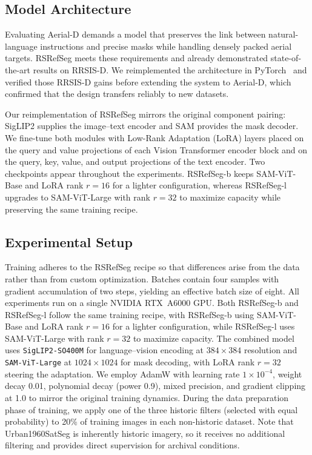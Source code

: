 \documentclass[journal]{IEEEtran}
\begin{document}
\subsection{Model Architecture}
\label{subsec:model_architecture}

Evaluating Aerial-D demands a model that preserves the link between natural-language instructions and precise masks while handling densely packed aerial targets. RSRefSeg meets these requirements and already demonstrated state-of-the-art results on RRSIS-D\cite{liu2024rotated}. We reimplemented the architecture in PyTorch~\cite{pytorch} and verified those RRSIS-D gains before extending the system to Aerial-D, which confirmed that the design transfers reliably to new datasets.

Our reimplementation of RSRefSeg\cite{chen2025rsrefseg} mirrors the original component pairing: SigLIP2\cite{siglip2} supplies the image--text encoder and SAM\cite{sam} provides the mask decoder. We fine-tune both modules with Low-Rank Adaptation (LoRA)\cite{lora} layers placed on the query and value projections of each Vision Transformer\cite{vit} encoder block and on the query, key, value, and output projections of the text encoder. Two checkpoints appear throughout the experiments. RSRefSeg-b keeps SAM-ViT-Base and LoRA rank $r=16$ for a lighter configuration, whereas RSRefSeg-l upgrades to SAM-ViT-Large with rank $r=32$ to maximize capacity while preserving the same training recipe.

\subsection{Experimental Setup}
\label{subsec:experimental_setup}

Training adheres to the RSRefSeg recipe so that differences arise from the data rather than from custom optimization. Batches contain four samples with gradient accumulation of two steps, yielding an effective batch size of eight. All experiments run on a single NVIDIA RTX~A6000 GPU. Both RSRefSeg-b and RSRefSeg-l follow the same training recipe, with RSRefSeg-b using SAM-ViT-Base and LoRA rank $r=16$ for a lighter configuration, while RSRefSeg-l uses SAM-ViT-Large with rank $r=32$ to maximize capacity. The combined model uses \texttt{SigLIP2-SO400M} for language--vision encoding at $384\times384$ resolution and \texttt{SAM-ViT-Large} at $1024\times1024$ for mask decoding, with LoRA rank $r=32$ steering the adaptation. We employ AdamW\cite{adamw} with learning rate $1\times10^{-4}$, weight decay 0.01, polynomial decay (power 0.9), mixed precision\cite{mixedprecision}, and gradient clipping at 1.0 to mirror the original training dynamics. During the data preparation phase of training, we apply one of the three historic filters (selected with equal probability) to 20\% of training images in each non-historic dataset. Note that Urban1960SatSeg is inherently historic imagery, so it receives no additional filtering and provides direct supervision for archival conditions.
\end{document}

